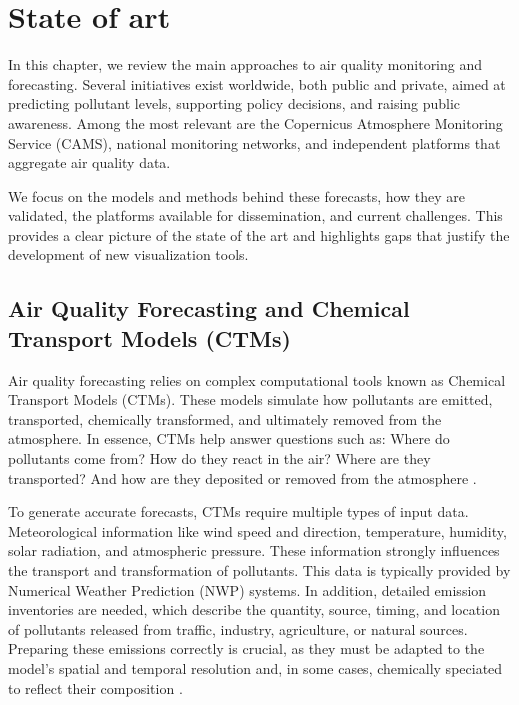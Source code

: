 \chapter[State of art]{State of art}
\label{Chap2}

In this chapter, we review the main approaches to air quality monitoring and forecasting. Several initiatives exist worldwide, both public and private, aimed at predicting pollutant levels, supporting policy decisions, and raising public awareness. Among the most relevant are the Copernicus Atmosphere Monitoring Service (CAMS), national monitoring networks, and independent platforms that aggregate air quality data.

We focus on the models and methods behind these forecasts, how they are validated, the platforms available for dissemination, and current challenges. This provides a clear picture of the state of the art and highlights gaps that justify the development of new visualization tools.

\section{Air Quality Forecasting and Chemical Transport Models (CTMs)}

Air quality forecasting relies on complex computational tools known as Chemical Transport Models (CTMs). These models simulate how pollutants are emitted, transported, chemically transformed, and ultimately removed from the atmosphere. In essence, CTMs help answer questions such as: Where do pollutants come from? How do they react in the air? Where are they transported? And how are they deposited or removed from the atmosphere \cite{sokhi2021advances}.

To generate accurate forecasts, CTMs require multiple types of input data. Meteorological information like wind speed and direction, temperature, humidity, solar radiation, and atmospheric pressure. These information strongly influences the transport and transformation of pollutants. This data is typically provided by Numerical Weather Prediction (NWP) systems. In addition, detailed emission inventories are needed, which describe the quantity, source, timing, and location of pollutants released from traffic, industry, agriculture, or natural sources. Preparing these emissions correctly is crucial, as they must be adapted to the model’s spatial and temporal resolution and, in some cases, chemically speciated to reflect their composition \cite{sokhi2021advances}.

